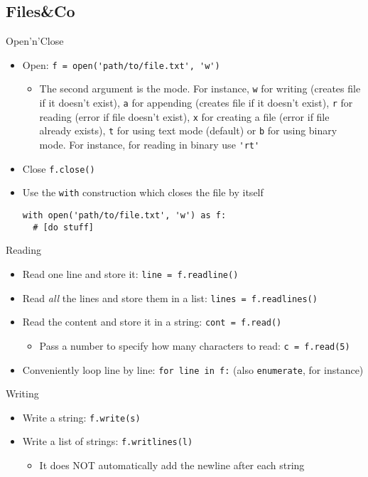 \documentclass[a4paper,12pt,%
              final%
              ]{article}
\begin{document}
\subsection{Files\&Co}
Open'n'Close
\begin{itemize}
  \item Open: \verb|f = open('path/to/file.txt', 'w')|
    \begin{itemize}
      \item The second argument is the mode. For instance, \verb|w| for writing (creates file if it doesn't exist), \verb|a| for appending (creates file if it doesn't exist), \verb|r| for reading (error if file doesn't exist), \verb|x| for creating a file (error if file already exists), \verb|t| for using text mode (default) or \verb|b| for using binary mode. For instance, for reading in binary use \verb|'rt'|
    \end{itemize}
  \item Close \verb|f.close()|
  \item Use the \verb|with| construction which closes the file by itself
\begin{verbatim}
with open('path/to/file.txt', 'w') as f:
  # [do stuff]
\end{verbatim}
\end{itemize}

Reading
\begin{itemize}
  \item Read one line and store it: \verb|line = f.readline()|
  \item Read \emph{all} the lines and store them in a list: \verb|lines = f.readlines()|
  \item Read the content and store it in a string: \verb|cont = f.read()|
    \begin{itemize}
      \item Pass a number to specify how many characters to read: \verb|c = f.read(5)|
    \end{itemize}
  \item Conveniently loop line by line: \verb|for line in f:| (also \verb|enumerate|, for instance)
\end{itemize}

Writing
\begin{itemize}
  \item Write a string: \verb|f.write(s)|
  \item Write a list of strings: \verb|f.writlines(l)|
    \begin{itemize}
      \item It does NOT automatically add the newline after each string
    \end{itemize}
\end{itemize}
\end{document}

